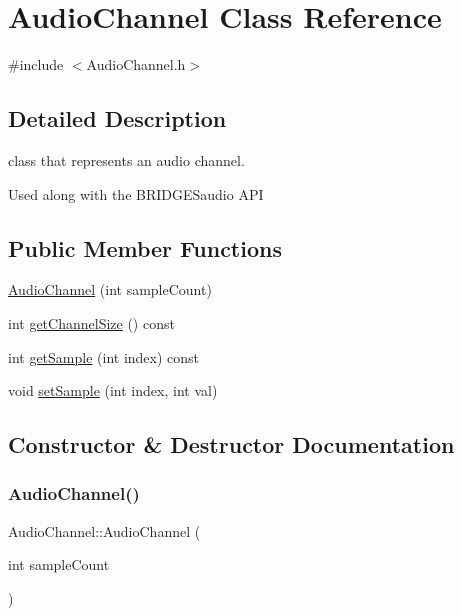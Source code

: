 \hypertarget{class_audio_channel}{}\section{Audio\+Channel Class Reference}
\label{class_audio_channel}


{\ttfamily \#include $<$Audio\+Channel.\+h$>$}



\subsection{Detailed Description}
class that represents an audio channel. 

Used along with the B\+R\+I\+D\+G\+E\+Saudio A\+PI \subsection*{Public Member Functions}
\begin{DoxyCompactItemize}
\item 
\hyperlink{class_audio_channel_a8ee2481871236bab12f567830fc8361b}{Audio\+Channel} (int sample\+Count)
\item 
int \hyperlink{class_audio_channel_a6a8bcd65a43fe0697c3368559c5775ca}{get\+Channel\+Size} () const
\item 
int \hyperlink{class_audio_channel_a5030a4c2bcf41e1f13479de45bbf6d01}{get\+Sample} (int index) const
\item 
void \hyperlink{class_audio_channel_a64bcb02bc7c731bc87d60c0ffabe7e99}{set\+Sample} (int index, int val)
\end{DoxyCompactItemize}


\subsection{Constructor \& Destructor Documentation}
\mbox{\label{class_audio_channel_a8ee2481871236bab12f567830fc8361b}} 
\subsubsection{\texorpdfstring{Audio\+Channel()}{AudioChannel()}}
{\footnotesize\ttfamily Audio\+Channel\+::\+Audio\+Channel (\begin{DoxyParamCaption}\item[{int}]{sample\+Count }\end{DoxyParamCaption})\hspace{0.3cm}{\ttfamily [inline]}}



